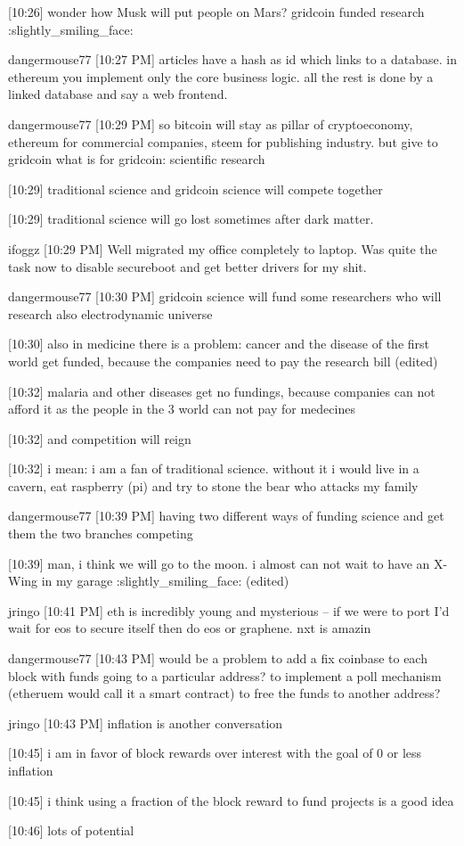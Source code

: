 {[10:26] 
wonder how Musk will put people on Mars? gridcoin funded research :slightly_smiling_face:


dangermouse77 [10:27 PM] 
articles have a hash as id which links to a database. in ethereum you implement only the core business logic. all the rest is done by a linked database and say a web frontend.


dangermouse77 [10:29 PM] 
so bitcoin will stay as pillar of cryptoeconomy, ethereum for commercial companies, steem for publishing industry. but give to gridcoin what is for gridcoin: scientific research


[10:29] 
traditional science and gridcoin science will compete together


[10:29] 
traditional science will go lost sometimes after dark matter.


ifoggz
[10:29 PM] 
Well migrated my office completely to laptop. Was quite the task now to disable secureboot and get better drivers for my shit.


dangermouse77 [10:30 PM] 
gridcoin science will fund some researchers who will research also electrodynamic universe


[10:30] 
also in medicine there is a problem: cancer and the disease of the first world get funded, because the companies need to pay the research bill (edited)


[10:32] 
malaria and other diseases get no fundings, because companies can not afford it as the people in the 3 world can not pay for medecines


[10:32] 
and competition will reign


[10:32] 
i mean: i am a fan of traditional science. without it i would live in a cavern, eat raspberry (pi) and try to stone the bear who attacks my family


dangermouse77 [10:39 PM] 
having two different ways of funding science and get them the two branches competing


[10:39] 
man, i think we will go to the moon. i almost can not wait to have an X-Wing in my garage :slightly_smiling_face: (edited)


jringo [10:41 PM] 
eth is incredibly young and mysterious -- if we were to port I'd wait for eos to secure itself then do eos or graphene.  nxt is amazin


dangermouse77 [10:43 PM] 
would be a problem to add a fix coinbase to each block with funds going to a particular address? to implement a poll mechanism (etheruem would call it a smart contract) to free the funds to another address?


jringo [10:43 PM] 
inflation is another conversation


[10:45] 
i am in favor of block rewards over interest with the goal of 0 or less inflation


[10:45] 
i think using a fraction of the block reward to fund projects is a good idea


[10:46] 
lots of potential
}